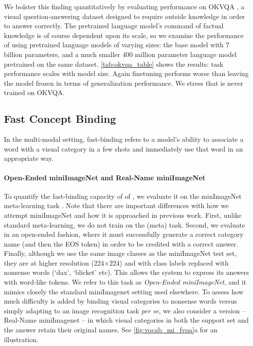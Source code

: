 We bolster this finding quantitatively by evaluating performance on OKVQA \cite{marino2019ok}, a visual question-answering dataset designed to require outside knowledge in order to answer correctly. The pretrained language model's command of factual knowledge is of course dependent upon its scale, so we examine the performance of \Model using pretrained language models of varying sizes: the base model with 7 billion parameters, and a much smaller 400 million parameter language model pretrained on the same dataset. \autoref{tab:okvqa_table} shows the results: task performance scales with model size. Again finetuning performs worse than leaving the model frozen in terms of generalization performance. We stress that \Model is never trained on OKVQA.

\subsection{Fast Concept Binding}
In the multi-modal setting, fast-binding refers to a model's ability to associate a word with a visual category in a few shots and immediately use that word in an appropriate way.

\paragraph{Open-Ended miniImageNet and Real-Name miniImageNet}

To quantify the fast-binding capacity of of \Model, we evaluate it on the minImageNet meta-learning task \cite{vinyals2016matching}. Note that there are important differences with how we attempt miniImageNet and how it is approached in previous work. First, unlike standard meta-learning, we do not train \Model on the (meta) task. Second, we evaluate \Model in an open-ended fashion, where it must successfully generate a correct category name (and then the EOS token) in order to be credited with a correct answer. Finally, although we use the same image classes as the miniImageNet test set, they are at higher resolution (224$\times$224) and with class labels replaced with nonsense words (`dax', `blicket' etc). This allows the system to express its answers with word-like tokens. We refer to this task as \emph{Open-Ended miniImageNet}, and it mimics closely the standard miniImagenet setting used elsewhere. To assess how much difficulty is added by binding visual categories to nonsense words versus simply adapting to an image recognition task \emph{per se}, we also consider a version --  Real-Name miniImagenet -- in which visual categories in both the support set and the answer retain their original names. See \autoref{fig:vocab_mi_fvqa}a for an illustration. 

